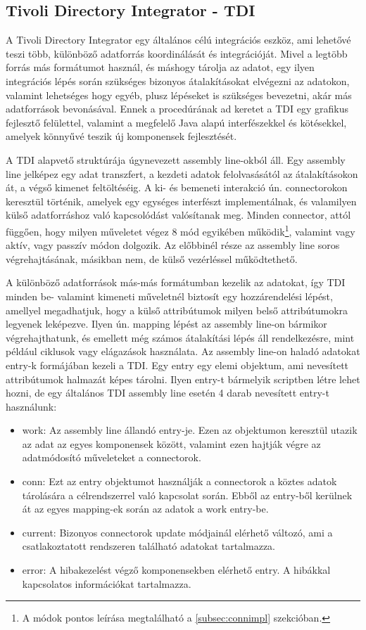 \subsection{Tivoli Directory Integrator - TDI}
\label{subsec:TDI}
A Tivoli Directory Integrator egy általános célú integrációs eszköz, ami lehetővé teszi több, különböző adatforrás koordinálását és integrációját.\cite{tdidoc} Mivel a legtöbb forrás más formátumot használ, és máshogy tárolja az adatot, egy ilyen integrációs lépés során szükséges bizonyos átalakításokat elvégezni az adatokon, valamint lehetséges hogy egyéb, plusz lépéseket is szükséges bevezetni, akár más adatforrások bevonásával. Ennek a procedúrának ad keretet a TDI egy grafikus fejlesztő felülettel, valamint a megfelelő Java alapú interfészekkel és kötésekkel, amelyek könnyűvé teszik új komponensek fejlesztését.

A TDI alapvető struktúrája úgynevezett assembly line-okból áll. Egy assembly line jelképez egy adat transzfert, a kezdeti adatok felolvasásától az átalakításokon át, a végső kimenet feltöltéséig. A ki- és bemeneti interakció ún. connectorokon keresztül történik, amelyek egy egységes interfészt implementálnak, és valamilyen külső adatforráshoz való kapcsolódást valósítanak meg. Minden connector, attól függően, hogy milyen műveletet végez 8 mód egyikében működik\footnote{A módok pontos leírása megtalálható a \ref{subsec:connimpl} szekcióban.}, valamint vagy aktív, vagy passzív módon dolgozik. Az előbbinél része az assembly line soros végrehajtásának, másikban nem, de külső vezérléssel működtethető.

A különböző adatforrások más-más formátumban kezelik az adatokat, így TDI minden be- valamint kimeneti műveletnél biztosít egy hozzárendelési lépést, amellyel megadhatjuk, hogy a külső attribútumok milyen belső attribútumokra legyenek leképezve. Ilyen ún. mapping lépést az assembly line-on bármikor végrehajthatunk, és emellett még számos átalakítási lépés áll rendelkezésre, mint például ciklusok vagy elágazások használata. Az assembly line-on haladó adatokat entry-k formájában kezeli a TDI.\cite{tdientry} Egy entry egy elemi objektum, ami nevesített attribútumok halmazát képes tárolni. Ilyen entry-t bármelyik scriptben létre lehet hozni, de egy általános TDI assembly line esetén 4 darab nevesített entry-t használunk:

\begin{itemize}
	\item work: Az assembly line állandó entry-je. Ezen az objektumon keresztül utazik az adat az egyes komponensek között, valamint ezen hajtják végre az adatmódosító műveleteket a connectorok.
	\item conn: Ezt az entry objektumot használják a connectorok a köztes adatok tárolására a célrendszerrel való kapcsolat során. Ebből az entry-ből kerülnek át az egyes mapping-ek során az adatok a work entry-be.
	\item current: Bizonyos connectorok update módjainál elérhető változó, ami a csatlakoztatott rendszeren található adatokat tartalmazza.
	\item error: A hibakezelést végző komponensekben elérhető entry. A hibákkal kapcsolatos információkat tartalmazza.
\end{itemize}

